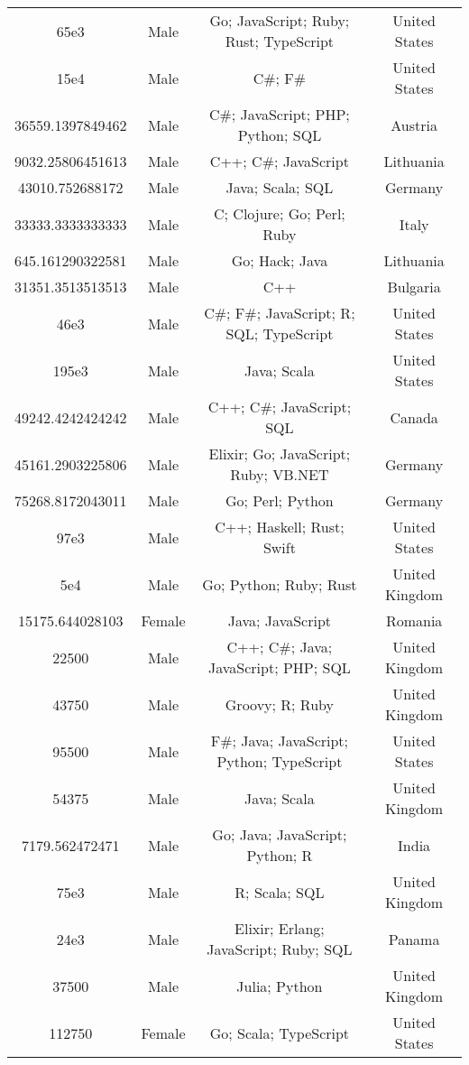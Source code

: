 \begin{center}
\begin{tabular}{ |c|c|c|c| }
65e3  &  Male  &  Go; JavaScript; Ruby; Rust; TypeScript  &  United States  \\ 
15e4  &  Male  &  C\#; F\#  &  United States  \\ 
36559.1397849462  &  Male  &  C\#; JavaScript; PHP; Python; SQL  &  Austria  \\ 
9032.25806451613  &  Male  &  C++; C\#; JavaScript  &  Lithuania  \\ 
43010.752688172  &  Male  &  Java; Scala; SQL  &  Germany  \\ 
33333.3333333333  &  Male  &  C; Clojure; Go; Perl; Ruby  &  Italy  \\ 
645.161290322581  &  Male  &  Go; Hack; Java  &  Lithuania  \\ 
31351.3513513513  &  Male  &  C++  &  Bulgaria  \\ 
46e3  &  Male  &  C\#; F\#; JavaScript; R; SQL; TypeScript  &  United States  \\ 
195e3  &  Male  &  Java; Scala  &  United States  \\ 
49242.4242424242  &  Male  &  C++; C\#; JavaScript; SQL  &  Canada  \\ 
45161.2903225806  &  Male  &  Elixir; Go; JavaScript; Ruby; VB.NET  &  Germany  \\ 
75268.8172043011  &  Male  &  Go; Perl; Python  &  Germany  \\ 
97e3  &  Male  &  C++; Haskell; Rust; Swift  &  United States  \\ 
5e4  &  Male  &  Go; Python; Ruby; Rust  &  United Kingdom  \\ 
15175.644028103  &  Female  &  Java; JavaScript  &  Romania  \\ 
22500  &  Male  &  C++; C\#; Java; JavaScript; PHP; SQL  &  United Kingdom  \\ 
43750  &  Male  &  Groovy; R; Ruby  &  United Kingdom  \\ 
95500  &  Male  &  F\#; Java; JavaScript; Python; TypeScript  &  United States  \\ 
54375  &  Male  &  Java; Scala  &  United Kingdom  \\ 
7179.562472471  &  Male  &  Go; Java; JavaScript; Python; R  &  India  \\ 
75e3  &  Male  &  R; Scala; SQL  &  United Kingdom  \\ 
24e3  &  Male  &  Elixir; Erlang; JavaScript; Ruby; SQL  &  Panama  \\ 
37500  &  Male  &  Julia; Python  &  United Kingdom  \\ 
112750  &  Female  &  Go; Scala; TypeScript  &  United States  \\ 

\end{tabular}
\end{center}
